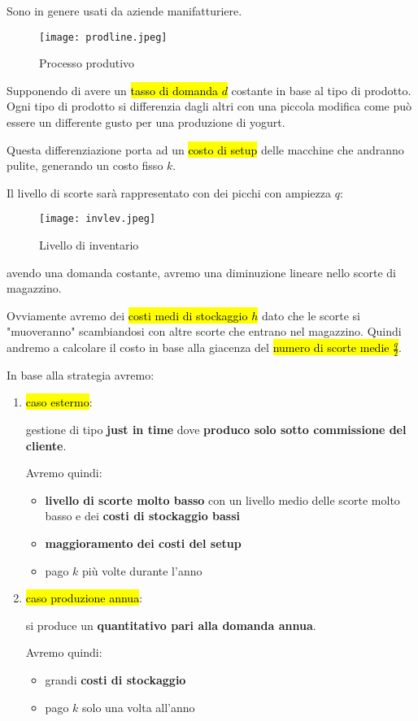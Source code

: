 Sono in genere usati da aziende manifatturiere. 


\begin{figure}[H]
\centering
\texttt{[image: prodline.jpeg]}
\caption{Processo produtivo} 
\label{procprod}
\end{figure}


Supponendo di avere un \hl{tasso di domanda $d$} costante in base al tipo di prodotto. Ogni tipo di prodotto si differenzia dagli altri con una piccola modifica come può essere un differente gusto per una produzione di yogurt.

Questa differenziazione porta ad un \hl{costo di setup} delle macchine che andranno pulite, generando un costo fisso $k$.

Il livello di scorte sarà rappresentato con dei picchi con ampiezza $q$:


\begin{figure}[H]
\centering
\texttt{[image: invlev.jpeg]}
\caption{Livello di inventario} 
\label{invlev}
\end{figure}


avendo una domanda costante, avremo una diminuzione lineare nello scorte di magazzino.

Ovviamente avremo dei \hl{costi medi di stockaggio $h$} dato che le scorte si "muoveranno" scambiandosi con altre scorte che entrano nel magazzino. Quindi andremo a calcolare il costo in base alla giacenza del \hl{numero di scorte medie $\frac{q}{2}$}.

In base alla strategia avremo:

\begin{enumerate}
	\item \hl{caso estermo}:
	
		gestione di tipo \textbf{just in time} dove \textbf{produco solo sotto commissione del cliente}.

		Avremo quindi:
		
		\begin{itemize}
			\item \textbf{livello di scorte molto basso} con un livello medio delle scorte molto basso e dei \textbf{costi di stockaggio bassi}
			\item \textbf{maggioramento dei costi del setup}
			\item pago $k$ più volte durante l'anno
		\end{itemize}
		
	\item \hl{caso produzione annua}:
	
		si produce un \textbf{quantitativo pari alla domanda annua}.
		
		Avremo quindi:
		
		\begin{itemize}
			\item grandi \textbf{costi di stockaggio}
			\item pago $k$ solo una volta all'anno
		\end{itemize}

\end{enumerate}


